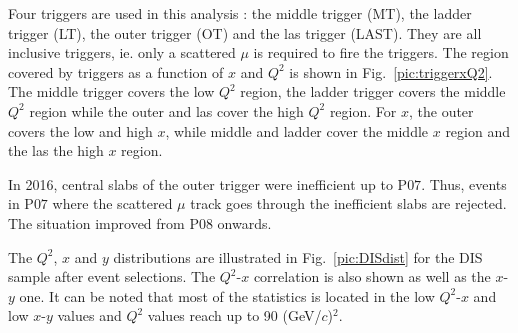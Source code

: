Four triggers are used in this analysis : the middle trigger (MT), the ladder trigger (LT), the outer trigger (OT) and the las trigger (LAST). They are all inclusive triggers, ie. only a scattered $\mu$ is required to fire the triggers. The region covered by triggers as a function of $x$ and $Q^2$ is shown in Fig.~\ref{pic:triggerxQ2}. The middle trigger covers the low $Q^2$ region, the ladder trigger covers the middle $Q^2$ region while the outer and las cover the high $Q^2$ region. For $x$, the outer covers the low and high $x$, while middle and ladder cover the middle $x$ region and the las the high $x$ region.

In 2016, central slabs of the outer trigger were inefficient up to P$07$. Thus, events in P$07$ where the scattered $\mu$ track goes through the inefficient slabs are rejected. The situation improved from P$08$ onwards.

The $Q^2$, $x$ and $y$ distributions are illustrated in Fig.~\ref{pic:DISdist} for the DIS sample after event selections. The $Q^2$-$x$ correlation is also shown as well as the $x$-$y$ one. It can be noted that most of the statistics is located in the low $Q^2$-$x$ and low $x$-$y$ values and $Q^2$ values reach up to 90 (GeV/$c$)$^2$.

